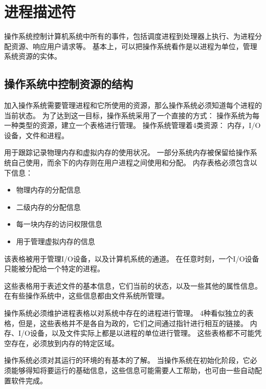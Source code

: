 
\section{进程描述符}
{
    操作系统控制计算机系统中所有的事件，包括调度进程到处理器上执行、为进程分配资源、响应用户请求等。
    基本上，可以把操作系统看作是以进程为单位，管理系统资源的实体。

    \subsection{操作系统中控制资源的结构}
    {
        加入操作系统需要管理进程和它所使用的资源，那么操作系统必须知道每个进程的当前状态。
        为了达到这一目标，操作系统采用了一个直接的方式：
        操作系统为每一种类型的资源，建立一个表格进行管理。
        操作系统管理着4类资源：
        内存，I/O设备，文件和进程。

        {
            用于跟踪记录物理内存和虚拟内存的使用状况。
            一部分系统内存被保留给操作系统自己使用，而余下的内存则在用户进程之间使用和分配。
            内存表格必须包含以下信息：

            \begin{itemize}
                \item 物理内存的分配信息
                \item 二级内存的分配信息
                \item 每一块内存的访问权限信息
                \item 用于管理虚拟内存的信息
            \end{itemize}
        }

        {
            该表格被用于管理I/O设备，以及计算机系统的通道。
            在任意时刻，一个I/O设备只能被分配给一个特定的进程。
        }

        {
            这些表格用于表述文件的基本信息，它们当前的状态，以及一些其他的属性信息。
            在有些操作系统中，这些信息都由文件系统所管理。
        }

        {
            操作系统必须维护进程表格以对系统中存在的进程进行管理。
            4种看似独立的表格，但是，这些表格并不是各自为政的，它们之间通过指针进行相互的链接。
            内存、I/O设备，以及文件实际上都是以进程的单位进行管理。
            这些表格都不可能凭空存在，必须放到内存的特定区域。

            操作系统必须对其运行的环境的有基本的了解。
            当操作系统在初始化阶段，它必须能够得知将要运行的基础信息，这些信息可能需要人工帮助，也可由一些自动配置软件完成。
        }
    }

}
